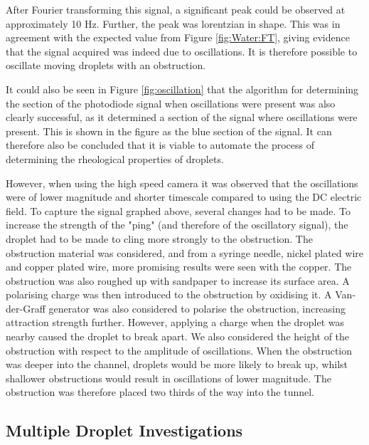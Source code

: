 \documentclass{physics_article_B}
\begin{document}
        After Fourier transforming this signal, a significant peak could be observed at approximately 10 Hz. Further, the peak was lorentzian in shape. This was in agreement with the expected value from Figure \ref{fig:Water:FT}, giving evidence that the signal acquired was indeed due to oscillations. It is therefore possible to oscillate moving droplets with an obstruction.
        
        It could also be seen in Figure \ref{fig:oscillation} that the algorithm for determining the section of the photodiode signal when oscillations were present was also clearly successful, as it determined a section of the signal where oscillations were present. This is shown in the figure as the blue section of the signal. It can therefore also be concluded that it is viable to automate the process of determining the rheological properties of droplets.
        
        However, when using the high speed camera it was observed that the oscillations were of lower magnitude and shorter timescale compared to using the DC electric field. To capture the signal graphed above, several changes had to be made. To increase the strength of the "ping" (and therefore of the oscillatory signal), the droplet had to be made to cling more strongly to the obstruction. The obstruction material was considered, and from a syringe needle, nickel plated wire and copper plated wire, more promising results were seen with the copper. The obstruction was also roughed up with sandpaper to increase its surface area. A polarising charge was then introduced to the obstruction by oxidising it. A Van-der-Graff generator was also considered to polarise the obstruction, increasing attraction strength further. However, applying a charge when the droplet was nearby caused the droplet to break apart. We also considered the height of the obstruction with respect to the amplitude of oscillations. When the obstruction was deeper into the channel, droplets would be more likely to break up, whilst shallower obstructions would result in oscillations of lower magnitude. The obstruction was therefore placed two thirds of the way into the tunnel. 
        
    \subsection{Multiple Droplet Investigations\label{sect:results:multi}}
    
\end{document}
